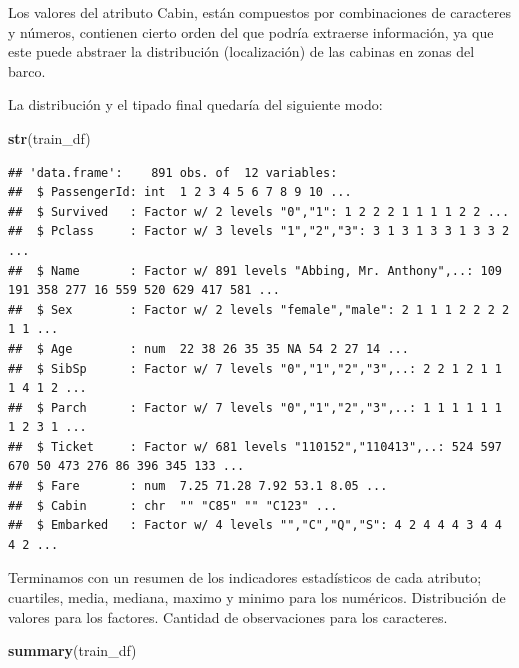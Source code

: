 \documentclass[]{article}
\newenvironment{Shaded}{\begin{snugshade}}{\end{snugshade}}
\newcommand{\KeywordTok}[1]{\textcolor[rgb]{0.13,0.29,0.53}{\textbf{#1}}}
\newcommand{\NormalTok}[1]{#1}
\newcommand{\OperatorTok}[1]{\textcolor[rgb]{0.81,0.36,0.00}{\textbf{#1}}}
\newcommand{\StringTok}[1]{\textcolor[rgb]{0.31,0.60,0.02}{#1}}
\begin{document}
Los valores del atributo Cabin, están compuestos por combinaciones de
caracteres y números, contienen cierto orden del que podría extraerse
información, ya que este puede abstraer la distribución (localización)
de las cabinas en zonas del barco.

\begin{Shaded}
\end{Shaded}

La distribución y el tipado final quedaría del siguiente modo:

\begin{Shaded}
\begin{Highlighting}[]
\KeywordTok{str}\NormalTok{(train_df)}
\end{Highlighting}
\end{Shaded}

\begin{verbatim}
## 'data.frame':    891 obs. of  12 variables:
##  $ PassengerId: int  1 2 3 4 5 6 7 8 9 10 ...
##  $ Survived   : Factor w/ 2 levels "0","1": 1 2 2 2 1 1 1 1 2 2 ...
##  $ Pclass     : Factor w/ 3 levels "1","2","3": 3 1 3 1 3 3 1 3 3 2 ...
##  $ Name       : Factor w/ 891 levels "Abbing, Mr. Anthony",..: 109 191 358 277 16 559 520 629 417 581 ...
##  $ Sex        : Factor w/ 2 levels "female","male": 2 1 1 1 2 2 2 2 1 1 ...
##  $ Age        : num  22 38 26 35 35 NA 54 2 27 14 ...
##  $ SibSp      : Factor w/ 7 levels "0","1","2","3",..: 2 2 1 2 1 1 1 4 1 2 ...
##  $ Parch      : Factor w/ 7 levels "0","1","2","3",..: 1 1 1 1 1 1 1 2 3 1 ...
##  $ Ticket     : Factor w/ 681 levels "110152","110413",..: 524 597 670 50 473 276 86 396 345 133 ...
##  $ Fare       : num  7.25 71.28 7.92 53.1 8.05 ...
##  $ Cabin      : chr  "" "C85" "" "C123" ...
##  $ Embarked   : Factor w/ 4 levels "","C","Q","S": 4 2 4 4 4 3 4 4 4 2 ...
\end{verbatim}

Terminamos con un resumen de los indicadores estadísticos de cada
atributo; cuartiles, media, mediana, maximo y minimo para los numéricos.
Distribución de valores para los factores. Cantidad de observaciones
para los caracteres.

\begin{Shaded}
\begin{Highlighting}[]
\KeywordTok{summary}\NormalTok{(train_df)}
\end{Highlighting}
\end{Shaded}
\end{document}

